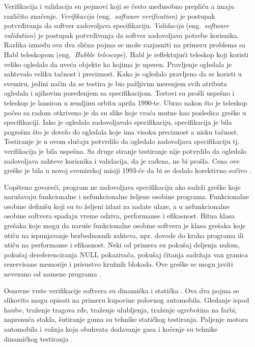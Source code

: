 \documentclass[12pt,oneside]{memoir}
\begin{document}
Verifikacija i validacija su pojmovi koji se često međusobno prepliću a imaju različito značenje. \textit{Verifikacija} (eng.~\textit{software verification}) je postupak potvrđivanja da softver zadovoljava specifikaciju. \textit{Validacija} (eng.~\textit{software validation}) je postupak potvrđivanja da softver zadovoljava potrebe korisnika. %
Razlika između ova dva slična pojma se može razjasniti na primeru problema sa Habl teleskopom (eng.~\textit{Hubble telescope}). Habl je reflektujući teleskop koji koristi veliko ogledalo da uveća objekte ka kojima je uperen. Pravljenje ogledala je zahtevalo veliku tačnost i preciznost. Kako je ogledalo pravljeno da se koristi u svemiru, jedini način da se testira je bio pažljivim merenjem svih atributa ogledala i njihovim poređenjem sa specifikacijom. Testovi su prošli uspešno i teleskop je lansiran u zemljinu orbitu aprila 1990-te. Ubrzo nakon što je teleskop počeo sa radom otkriveno je da su slike koje vraća mutne kao posledica greške u specifikaciji. Iako je ogledalo zadovoljavalo specifikaciju, specifikacija je bila pogrešna što je dovelo do ogledala koje ima visoku preciznost a nisku tačnost. Testiranje je u ovom slučaju potvrdilo da ogledalo zadovoljava specifikaciju tj. verifikacija je bila uspešna. Sa druge stranje testiranje nije potvrdilo da ogledalo zadovoljava zahteve korisnika i validacija, da je rađena, ne bi prošla. Cena ove greške je bila u novoj svemirskoj misiji 1993-će da bi se dodalo korektivno sočivo \cite{SoftTest}.

Uopšteno govoreći, program ne zadovoljava specifikaciju ako sadrži greške koje narušavaju funkcionalne i nefunkcionalne željene osobine programa. Funkcionalne osobine definišu koji su to željeni izlazi za zadate ulaze, a u nefunkcionalne osobine softvera spadaju vreme odziva, performanse i efikasnost. Bitna klasa grešaka koje mogu da naruše funkcionalne osobine softvera je klasa grešaka koje utiču na ispunjavanje bezbednosnih zahteva, npr. dovode do kraha programa ili utiču na performanse i efikasnost. Neki od primera su pokušaj deljenja nulom, pokušaj dereferenciranja NULL pokazivača, pokušaj čitanja sadržaja van granica rezervisane memorije i prisustvo kružnih blokada. Ove greške se mogu javiti nevezano od namene programa  \cite{mvj}.

Osnovne vrste verifikacije softvera su dinamička i statička  \cite{mvj}. Ova dva pojma se slikovito mogu opisati na primeru kupovine polovnog automobila. Gledanje ispod haube, traženje tragova rđe, traženje ulubljenja, traženje ogrebotina na farbi, naprsnuća stakla, šutiranje guma su tehnike statičkog testiranja. Paljenje motora automobila i vožnja koja obuhvata dodavanje gasa i kočenje su tehnike dinamičkog testiranja \cite{SoftTest}.
\end{document}
